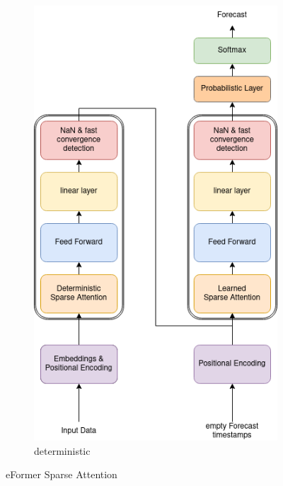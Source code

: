 \documentclass{article}
\begin{document}
\begin{figure}[!ht]
\begin{subfigure}[b]{0.4\linewidth}
        \includegraphics[width=\linewidth]{graphs/eFormer_det_sparse.png}
        \caption{deterministic}
    \end{subfigure}
    \hspace*{\fill}
    \caption{eFormer Sparse Attention}
    \label{fig:eFormer_sparse}
\end{figure}
\end{document}
